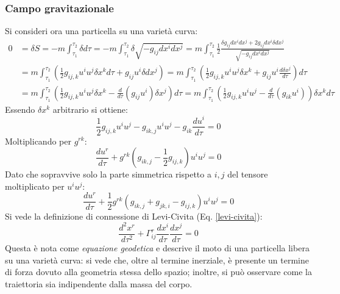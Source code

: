 \subsubsection{Campo gravitazionale}

Si consideri ora una particella su una varietà curva:
\begin{equation*}
	\begin{split}
		0
		&= \delta S = -m \int_{\tau_1}^{\tau_2} \delta d\tau = -m \int_{\tau_1}^{\tau_2} \delta \sqrt{- g_{ij} dx^i dx^j} = m \int_{\tau_1}^{\tau_2} \frac{1}{2} \frac{\delta g_{ij} dx^i dx^j + 2g_{ij} dx^i \delta dx^j}{\sqrt{- g_{ij} dx^i dx^j}}\\
		&= m \int_{\tau_1}^{\tau_2} \left( \frac{1}{2} g_{ij,k} u^i u^j \delta x^k d\tau + g_{ij} u^i \delta dx^j \right) = m \int_{\tau_1}^{\tau_2} \left( \frac{1}{2} g_{ij,k} u^i u^j \delta x^k + g_{ij} u^i \frac{d\delta x^j}{d\tau} \right) d\tau\\
		&= m \int_{\tau_1}^{\tau_2} \left( \frac{1}{2} g_{ij,k} u^i u^j \delta x^k - \frac{d}{d\tau} \left( g_{ij} u^i \right) \delta x^j \right) d\tau = m \int_{\tau_1}^{\tau_2} \left( \frac{1}{2} g_{ij,k} u^i u^j - \frac{d}{d\tau} \left( g_{ik} u^i \right) \right) \delta x^k d\tau
	\end{split}
\end{equation*}
Essendo $ \delta x^k $ arbitrario si ottiene:
\begin{equation}
	\frac{1}{2} g_{ij,k} u^i u^j - g_{ik,j} u^i u^j - g_{ik} \frac{du^i}{d\tau} = 0
	\label{eq:5.9}
\end{equation}
Moltiplicando per $ g^{rk} $:
\begin{equation}
	\frac{du^r}{d\tau} + g^{rk} \left( g_{ik,j} - \frac{1}{2} g_{ij,k} \right) u^i u^j = 0
	\label{eq:5.10}
\end{equation}
Dato che sopravvive solo la parte simmetrica rispetto a $ i,j $ del tensore moltiplicato per $ u^i u^j $:
\begin{equation}
	\frac{du^r}{d\tau} + \frac{1}{2} g^{rk} \left( g_{ik,j} + g_{jk,i} - g_{ij,k} \right) u^i u^j = 0
	\label{eq:5.11}
\end{equation}
Si vede la definizione di connessione di Levi-Civita (Eq. \ref{levi-civita}):
\begin{equation}
	\frac{d^2 x^r}{d\tau^2} + \Gamma^r_{ij} \frac{dx^i}{d\tau} \frac{dx^j}{d\tau} = 0
	\label{eq:5.12}
\end{equation}
Questa è nota come \textit{equazione geodetica} e descrive il moto di una particella libera su una varietà curva: si vede che, oltre al termine inerziale, è presente un termine di forza dovuto alla geometria stessa dello spazio; inoltre, si può osservare come la traiettoria sia indipendente dalla massa del corpo.
